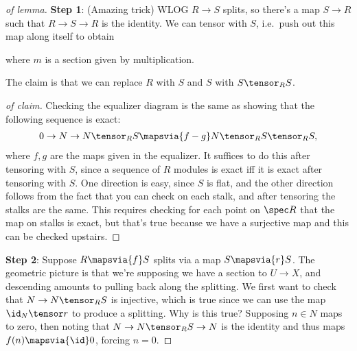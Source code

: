 \begin{proof}[of lemma]

\textbf{Step 1}: (Amazing trick) WLOG \(R\to S\) splits, so there's a
map \(S\to R\) such that \(R\to S\to R\) is the identity. We can tensor
with \(S\), i.e.~push out this map along itself to obtain

\begin{center}
\end{center}

where \(m\) is a section given by multiplication.

\begin{claim}

The claim is that we can replace \(R\) with \(S\) and \(S\) with
\(S\tensor_R S\).

\end{claim}

\begin{proof}[of claim]

Checking the equalizer diagram is the same as showing that the following
sequence is exact:
\begin{align*}  
0 \to N \to N\tensor_R S \mapsvia{f-g} N\tensor_R S\tensor_R S
,\end{align*} where \(f, g\) are the maps given in the equalizer. It
suffices to do this after tensoring with \(S\), since a sequence of
\(R\) modules is exact iff it is exact after tensoring with \(S\). One
direction is easy, since \(S\) is flat, and the other direction follows
from the fact that you can check on each stalk, and after tensoring the
stalks are the same. This requires checking for each point on
\(\spec R\) that the map on stalks is exact, but that's true because we
have a surjective map and this can be checked upstairs.

\end{proof}

\textbf{Step 2}: Suppose \(R\mapsvia{f} S\) splits via a map
\(S\mapsvia{r} S\). The geometric picture is that we're supposing we
have a section to \(U\to X\), and descending amounts to pulling back
along the splitting. We first want to check that \(N\to N\tensor_R S\)
is injective, which is true since we can use the map \(\id_N \tensor r\)
to produce a splitting. Why is this true? Supposing \(n\in N\) maps to
zero, then noting that \(N\to N\tensor_R S \to N\) is the identity and
thus maps \(f(n)\mapsvia{\id} 0\), forcing \(n=0\).


\end{proof}
